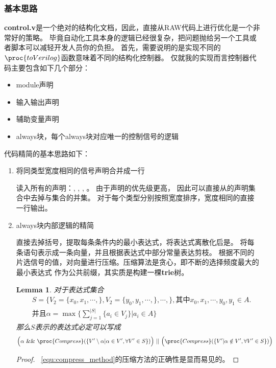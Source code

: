 \documentclass[hyperref,UTF8]{ctexart}
\newtheorem{lem}[thm]{Lemma}
\theoremstyle{definition}
\theoremstyle{remark}
\numberwithin{equation}{subsection}
\newcommand{\Emph}{\textbf}
\begin{document}
\subsubsection{基本思路}
	
	\Emph{control.v}是一个绝对的结构化文档，因此，直接从RAW代码上进行优化是一个非常好的策略。
	毕竟自动化工具本身的逻辑已经很复杂，把问题抛给另一个工具或者脚本可以减轻开发人员你的负担。
	首先，需要说明的是实现不同的$\proc{toVerilog}$函数意味着不同的结构化控制器。
	仅就我的实现而言控制器代码主要包含如下几个部分：
	\begin{itemize}
		\item module声明
		\item 输入输出声明
		\item 辅助变量声明
		\item always块，每个always块对应唯一的控制信号的逻辑
	\end{itemize}
	
	代码精简的基本思路如下：
	\begin{enumerate}[(1)]
	
		\item 将同类型宽度相同的信号声明合并成一行
		
		读入所有的声明：, , , 。
		由于声明的优先级更高，
		因此可以直接从的声明集合中去掉与集合的并集。
		对于每个类型分别按照宽度排序，宽度相同的直接一行输出。
		
		\item always块内部逻辑的精简
		
		直接去掉括号，提取每条条件内的最小表达式，将表达式离散化后是。
		将每条语句表示成一条向量，并且根据表达式中部分常量表达剪枝。
		根据不同的片选信号的值，对向量进行压缩。压缩算法是贪心，即不断的选择频度最大的最小表达式
		作为公共前缀，其实质是构建一棵\Emph{trie}树。
		\begin{lem}
		\label{lem:always_compress}
		对于表达式集合
		\begin{equation*}
        \begin{split}
			&S = \{V_2 = \{x_0, x_1, \cdots, \}, V_2 = \{y_0, y_1, \cdots, \}, \cdots, \},
				\text{其中}x_0, x_1, \cdots, y_0, y_1 \in A.  \\
				&\text{并且}\alpha = \max \{\sum_{j=1}^{|S|} \{a_i \in V_j\} | a_i \in A\}
        \end{split}
		\end{equation*}
		那么$S$表示的表达式必定可以写成
		\begin{equation}
		\label{equ:compress_method}
			\Big( \alpha \ \&\&\  \proc{Compress}(\{V' \setminus \alpha | \alpha \in V', \forall V' \in S\}) \Big) \ ||\
			\Big( \proc{Compress}(\{V' | \alpha \notin V', \forall V' \in S \}) \Big)
		\end{equation}
		\end{lem}
		
		\begin{proof}
		~\ref{equ:compress_method}的压缩方法的正确性是显而易见的。
		\end{proof}
		
	\end{enumerate}
	
\end{document}
